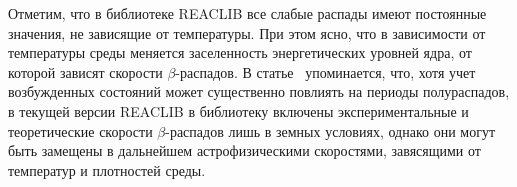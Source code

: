 
  Отметим, что в библиотеке REACLIB все слабые распады имеют постоянные значения, не зависящие от температуры. При этом ясно, что в зависимости от температуры среды меняется заселенность энергетических уровней ядра, от которой зависят скорости $\beta$-распадов. В статье~\cite{reaclib2010} упоминается, что, хотя учет возбужденных состояний может существенно повлиять на периоды полураспадов, в текущей версии REACLIB в библиотеку включены экспериментальные и теоретические скорости $\beta$-распадов лишь в земных условиях, однако они могут быть замещены в дальнейшем астрофизическими скоростями, завясящими от температур и плотностей среды.

